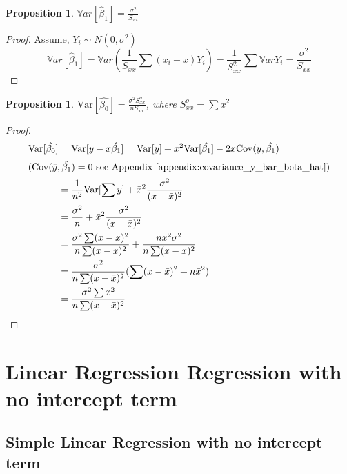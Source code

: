 \documentclass[12pt,a4paper,oneside]{book} %
\newtheorem{proposition}[theorem]{Proposition}
\newcommand{\Var}{\mathrm{Var}}
\newcommand{\Cov}{\mathrm{Cov}}
\begin{document}
\begin{proposition}
	$\mathbb{V}ar[\hat{\beta}_1] = \frac{\sigma^2}{S_{xx}}$
\end{proposition}

\begin{proof}
	Assume, $Y_i \sim N(0, \sigma^2) $
	\[
		\mathbb{V}ar[\hat{\beta}_1] = \mathbb{V}ar (\frac{1}{S_{xx}}\sum (x_i-\bar{x})Y_i) = \frac{1}{S_{xx}^2}\sum \mathbb{V}ar Y_i = \frac{\sigma^2}{S_{xx}}
	\]
\end{proof}

\begin{proposition}
	$\Var [\hat{\beta_0}]= \frac{\sigma^2 S_{xx}^o}{n S_{xx}} $, where $S_{xx}^o=\sum x^2$
\end{proposition}



\begin{proof}
	\begin{align*}
		\Var [\hat{\beta_0}] &= \Var [\bar{y}- \bar{x}\hat{\beta_1}] = \Var [\bar{y}] + \bar{x}^2 \Var [\hat{\beta_1}]- 2\bar{x} \Cov (\bar{y}, \hat{\beta_1}) = \\ 
		\intertext{($\Cov (\bar{y}, \hat{\beta_1})=0$ see Appendix \ref{appendix:covariance_y_bar_beta_hat})}
		&= \frac{1}{n^2}\Var [\sum y] + \bar{x}^2 \frac{\sigma^2}{(x-\bar{x})^2} \\
		&= \frac{\sigma^2}{n}+\bar{x}^2 \frac{\sigma^2}{(x-\bar{x})^2} \\
		&= \frac{\sigma^2 \sum (x-\bar{x})^2}{n \sum (x-\bar{x})^2}+\frac{n \bar{x}^2 \sigma^2}{n \sum (x- \bar{x})^2} \\
		&= \frac{\sigma^2 }{n \sum (x-\bar{x})^2} (\sum (x-\bar{x})^2+n\bar{x}^2) \\
		&= \frac{\sigma^2 \sum x^2}{n \sum (x-\bar{x})^2}
	\end{align*}
\end{proof}

	\clearpage





\chapter{Linear Regression Regression with no intercept term}

	\section{Simple Linear Regression with no intercept term}
\end{document}
